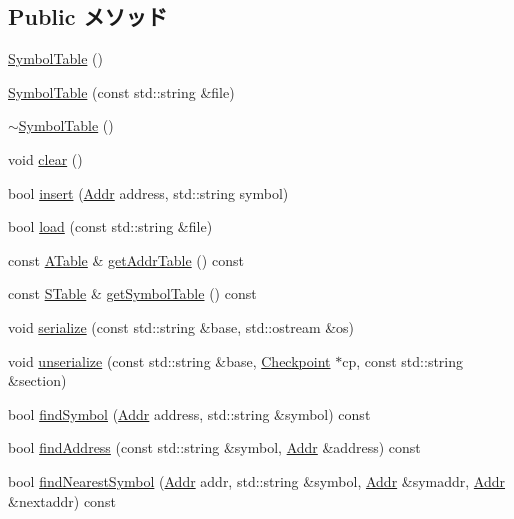 \subsection*{Public メソッド}
\begin{DoxyCompactItemize}
\item 
\hyperlink{classSymbolTable_a8b1c95b7c6fcc42a2755109c007522df}{SymbolTable} ()
\item 
\hyperlink{classSymbolTable_ae77cee612a9d2a6f7a551a160d2881b3}{SymbolTable} (const std::string \&file)
\item 
\hyperlink{classSymbolTable_a7287b454c50232a03ae1ccd90d952d02}{$\sim$SymbolTable} ()
\item 
void \hyperlink{classSymbolTable_ac8bb3912a3ce86b15842e79d0b421204}{clear} ()
\item 
bool \hyperlink{classSymbolTable_a353cad0b34c8bd0e7e0341a8061b054d}{insert} (\hyperlink{base_2types_8hh_af1bb03d6a4ee096394a6749f0a169232}{Addr} address, std::string symbol)
\item 
bool \hyperlink{classSymbolTable_a9c68305a6794dc960db947d68839b724}{load} (const std::string \&file)
\item 
const \hyperlink{classSymbolTable_a774a5b092c28960e65c8301f26a0bf88}{ATable} \& \hyperlink{classSymbolTable_a8f7d793012417ce9fe6e6c8e9297fccb}{getAddrTable} () const 
\item 
const \hyperlink{classSymbolTable_ad1bd5f7577278d0dd7a1b10fe53e8d9e}{STable} \& \hyperlink{classSymbolTable_aa116520a144e1e071acb011e028dcb79}{getSymbolTable} () const 
\item 
void \hyperlink{classSymbolTable_ab4138b21b48e3371a8e20df72b675a88}{serialize} (const std::string \&base, std::ostream \&os)
\item 
void \hyperlink{classSymbolTable_a147c320e3d6506edf5587a40cd8e430d}{unserialize} (const std::string \&base, \hyperlink{classCheckpoint}{Checkpoint} $\ast$cp, const std::string \&section)
\item 
bool \hyperlink{classSymbolTable_a4b647562ef2e4ebd101bbbd93c13bd25}{findSymbol} (\hyperlink{base_2types_8hh_af1bb03d6a4ee096394a6749f0a169232}{Addr} address, std::string \&symbol) const 
\item 
bool \hyperlink{classSymbolTable_a14c997354df4213240205fe85d61a504}{findAddress} (const std::string \&symbol, \hyperlink{base_2types_8hh_af1bb03d6a4ee096394a6749f0a169232}{Addr} \&address) const 
\item 
bool \hyperlink{classSymbolTable_a924f4948c47d7e7f08aee0527921629f}{findNearestSymbol} (\hyperlink{base_2types_8hh_af1bb03d6a4ee096394a6749f0a169232}{Addr} addr, std::string \&symbol, \hyperlink{base_2types_8hh_af1bb03d6a4ee096394a6749f0a169232}{Addr} \&symaddr, \hyperlink{base_2types_8hh_af1bb03d6a4ee096394a6749f0a169232}{Addr} \&nextaddr) const 

\end{DoxyCompactItemize}
